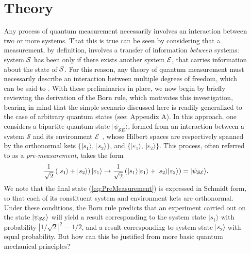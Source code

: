 \documentclass[12pt]{iopart}
\begin{document}
\section{Theory}
{Any process of quantum measurement necessarily involves an interaction between two or more systems. That this is true can be seen by considering that a measurement, by definition, involves a transfer of information \textit{between} systems: system ${\cal S}$ has been  only if there exists another system ${\cal E}$, that carries information about the state of ${\cal S}$. For this reason, any theory of quantum measurement must necessarily describe an interaction between multiple degrees of freedom, which can be said to . With these preliminaries in place, we now begin by briefly} reviewing the derivation of the Born rule, which motivates this investigation, bearing in mind that the simple scenario discussed here is readily generalized to the case of arbitrary quantum states (see: Appendix A). In this approach, one considers a bipartite quantum state $|\psi_{\mathcal SE}\rangle$, formed from an interaction between a system $\mathcal{S}$ and its environment $\mathcal{E}$~{\cite{footnotedef}}, whose Hilbert spaces are respectively spanned by the orthonormal kets $\{|s_1\rangle$, $|s_2\rangle\}$, and $\{|\varepsilon_1\rangle$, $|\varepsilon_2\rangle\}$. This process, often referred to as a \textit{pre-measurement}, takes the form
%
\begin{eqnarray}\label{eq:PreMeasurement}
	\frac{1}{\sqrt{2}}\left(|s_1\rangle + |s_2\rangle\right) |\varepsilon_1\rangle \rightarrow \frac{1}{\sqrt{2}}\left(|s_1\rangle|\varepsilon_1\rangle + |s_2\rangle|\varepsilon_2 \rangle \right) = |\psi_{\cal SE}\rangle.
\end{eqnarray}
%
We note that the final state (\ref{eq:PreMeasurement}) is expressed in Schmidt form, so that each of its constituent system and environment kets are orthonormal. Under these conditions, the Born rule predicts that an experiment carried out on the state $|\psi_{\cal SE}\rangle$ will yield a result corresponding to the system state $|s_1\rangle$ with probability $|1/\sqrt{2}|^2=1/2$, and a result corresponding to system state $|s_2\rangle$ with equal probability. But how can this be justified from more basic quantum mechanical principles? 
\end{document}
